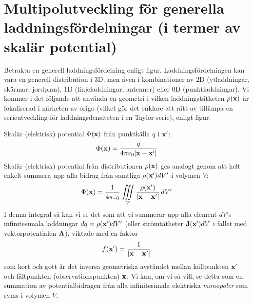 \section{Multipolutveckling f\"or generella laddningsf{\"o}rdelningar
         (i termer av skal{\"a}r potential)}
Betrakta en generell laddningsf{\"o}rdelning enligt figur.
Laddningsf{\"ordelningen} kan vara en generell distribution i 3D, men {\"a}ven
i kombinationer av 2D (ytladdningar, sk{\"a}rmar, jordplan),
1D (linjeladdningar, antenner) eller 0D (punktladdningar). Vi kommer i det
f{\"o}ljande att anv{\"a}nda en geometri i vilken laddningst{\"a}theten
$\rho({\bf x})$ {\"a}r lokaliserad i n{\"a}rheten av origo (vilket g{\"o}r
det enklare att r{\"a}tt av till{\"a}mpa en serieutveckling f{\"o}r
laddningsdensiteten i en Taylor-serie), enligt figur.
\bigskip
\centerline{}
\medskip
\noindent
Skal{\"a}r (elektrisk) potential $\Phi({\bf x})$ fr{\aa}n punktk{\"a}lla $q$ i
${\bf x}'$:
$$
  \Phi({\bf x})={{q}\over{4\pi\varepsilon_0|{\bf x}-{\bf x}'|}}
$$
\noindent
Skal{\"a}r (elektrisk) potential fr{\aa}n distributionen $\rho({\bf x})$ ges
analogt genom att helt enkelt summera upp alla bidrag fr{\aa}n samtliga
$\rho({\bf x}')dV'$ i volymen $V$:
$$
  \Phi({\bf x})={{1}\over{4\pi\varepsilon_0}}
     \iiint_{V}{{\rho({\bf x}')}\over{|{\bf x}-{\bf x}'|}}\,dV'
$$
I denna integral s{\aa} kan vi se det som att vi summerar upp alla element
$dV$'s infinitesimala laddningar $dq=\rho({\bf x}')dV'$ (eller
str{\"o}mt{\"a}theter ${\bf J}({\bf x}')dV$ i fallet med vektorpotentialen
${\bf A}$), viktade med en faktor
$$
  f({\bf x}')={{1}\over{|{\bf x}-{\bf x}'|}}
$$
som kort och gott {\"a}r det inversa geometriska avst{\aa}ndet mellan
k{\"a}llpunkten ${\bf x}'$ och f{\"a}ltpunkten (observationspunkten) ${\bf x}$.
Vi kan, om vi s{\aa} vill, se detta som en summation av potentialbidragen
fr{\aa}n alla infinitesimala elektriska {\it monopoler} som ryms i volymen
$V$.

